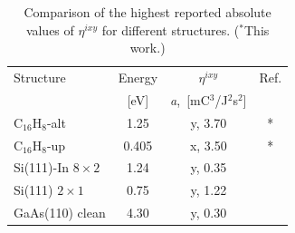 \documentclass[twocolumn,aps,pra,11pt,tightenlines,showpacs,superscriptaddress,groupedaddress]{revtex4-1}
\newcommand{\ea}{$\eta^{ixy}$}
\newcommand{\altstc}{C$_{16}$H$_{8}$-alt}
\newcommand{\upstc}{C$_{16}$H$_{8}$-up}
\begin{document}
\begin{table}[]
    \caption{Comparison of the highest reported absolute values of {\ea} for different structures. ($^{*}$This work.)}
    \label{tab:etacomp}
    \centering
    \begin{ruledtabular}
    \begin{tabular}{lccc}
    Structure & Energy &{\ea} &  Ref.\\
              & [eV]   & \hspace{-2.5mm} \emph{a},\, [mC$^{3}$/J$^{2}$s$^{2}$] \\
    \hline
    {\altstc}               & 1.25  & y, 3.70  & *     \\
    {\upstc}                & 0.405 & x, 3.50  & *     \\
    Si(111)-In $8\times2$   & 1.24  & y, 0.35  & \cite{arzate2014optical}  \\
    Si(111) $2\times1$      & 0.75  & y, 1.22  & \cite{mendoza2012optical} \\
    GaAs(110) clean         & 4.30  & y, 0.30  & \cite{nastos2007full}     \\
    \end{tabular}
    \end{ruledtabular}
\end{table}
\end{document}
